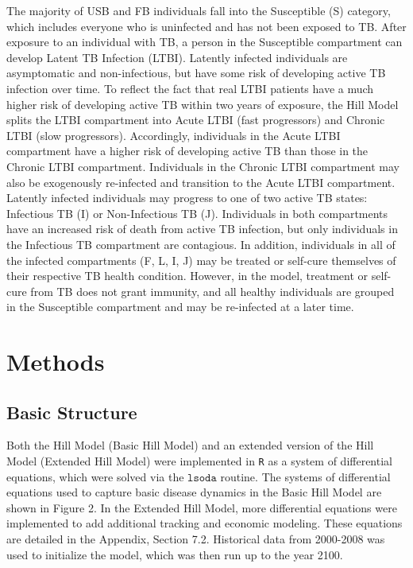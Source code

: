 \documentclass{amsart}
\begin{document}
The majority of USB and FB individuals fall into the Susceptible (S) category,
which includes everyone who is uninfected and has not been exposed to TB.  After
exposure to an individual with TB, a person in the Susceptible compartment can
develop Latent TB Infection (LTBI). Latently infected individuals are
asymptomatic and non-infectious, but have some risk of developing active TB
infection over time. To reflect the fact that real LTBI patients have a
much higher risk of developing active TB within two years of exposure, the Hill
Model splits the LTBI compartment into Acute LTBI (fast progressors) and Chronic
LTBI (slow progressors). Accordingly, individuals in the Acute LTBI compartment
have a higher risk of developing active TB than those in the Chronic LTBI
compartment.  Individuals in the Chronic LTBI compartment may also be
exogenously re-infected and transition to the Acute LTBI compartment.  \\

Latently infected individuals may progress to one of two active TB states: Infectious TB (I) or 
Non-Infectious TB (J).  Individuals in both compartments have an increased risk of death from
active TB infection, but only individuals in the Infectious TB compartment are contagious.  
In addition, individuals in all of the infected compartments (F, L, I, J) may be treated or self-cure
themselves of their respective TB health condition.  However, in the model, treatment or self-cure from TB
does not grant immunity, and all healthy individuals are grouped in the Susceptible compartment
and may be re-infected at a later time.  \\

\section{Methods}
\subsection{Basic Structure}
Both the Hill Model (Basic Hill Model) and an extended version of the Hill Model (Extended Hill 
Model) were implemented in 
\texttt{R} as a system of differential equations, which were solved via the
$\texttt{lsoda}$ routine. The systems of differential equations used to capture basic disease dynamics in the Basic Hill Model are shown in Figure 2. In the Extended Hill Model,
more differential equations were implemented to add additional tracking and
economic modeling. These equations are detailed in the Appendix, Section 7.2. 
Historical data from 2000-2008 was used to initialize the model, which was then run up to the
year 2100.  
\end{document}
